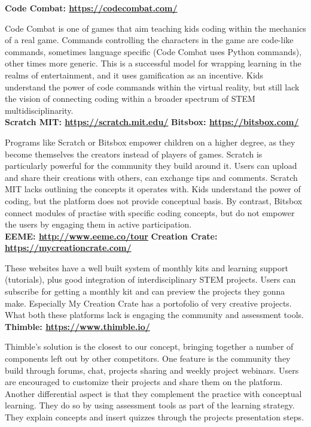 \textbf{Code Combat: \url{https://codecombat.com/}}

Code Combat is one of games that aim teaching kids coding within the mechanics of a real game. Commands controlling the characters in the game are code-like commands, sometimes language specific (Code Combat uses Python commands), other times more generic. 
This is a successful model for wrapping learning in the realms of entertainment, and it uses gamification as an incentive. Kids understand the power of code commands within the virtual reality, but still lack the vision of connecting coding within a broader spectrum of STEM multidisciplinarity.\\

\textbf{Scratch MIT: \url{https://scratch.mit.edu/}}
\textbf{Bitsbox: \url{https://bitsbox.com/}}

Programs like Scratch or Bitsbox empower children on a higher degree, as they become themselves the creators instead of players of games. 
Scratch is particularly powerful for the community they build around it. Users can upload and share their creations with others, can exchange tips and comments. 
Scratch MIT lacks outlining the concepts it operates with. Kids understand the power of coding, but the platform does not provide conceptual basis.
By contrast, Bitsbox connect modules of practise with specific coding concepts, but do not empower the users by engaging them in active participation. \\

\textbf{EEME: \url{http://www.eeme.co/tour}}
\textbf{Creation Crate: \url{https://mycreationcrate.com/}}

These websites have a well built system of monthly kits and learning support (tutorials), plus good integration of interdisciplinary STEM projects. Users can subscribe for getting a monthly kit and can preview the projects they gonna make. Especially My Creation Crate has a portofolio of very creative projects.
What both these platforms lack is engaging the community and assessment tools.\\

\textbf{Thimble: \url{https://www.thimble.io/}}

Thimble's solution is the closest to our concept, bringing together a number of components left out by other competitors. 
One feature is the community they build through forums, chat, projects sharing and weekly project webinars. Users are encouraged to customize their projects and share them on the platform. 
Another differential aspect is that they complement the practice with conceptual learning. They do so by using assessment tools as part of the learning strategy. They explain concepts and insert quizzes through the projects presentation steps.\\



